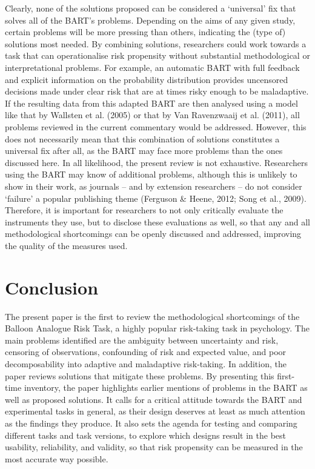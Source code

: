 \documentclass[serif, twocolumn, review]{jote-article}
\begin{document}
Clearly, none of the solutions proposed can be considered a `universal' fix that solves all of the BART's problems. Depending on the aims of any given study, certain problems will be more pressing than others, indicating the (type of) solutions most needed. By combining solutions, researchers could work towards a task that can operationalise risk propensity without substantial methodological or interpretational problems. For example, an automatic BART with full feedback and explicit information on the probability distribution provides uncensored decisions made under clear risk that are at times risky enough to be maladaptive. If the resulting data from this adapted BART are then analysed using a model like that by Wallsten et al. (2005) or that by Van Ravenzwaaij et al. (2011), all problems reviewed in the current commentary would be addressed. However, this does not necessarily mean that this combination of solutions constitutes a universal fix after all, as the BART may face more problems than the ones discussed here. In all likelihood, the present review is not exhaustive. Researchers using the BART may know of additional problems, although this is unlikely to show in their work, as journals -- and by extension researchers -- do not consider `failure' a popular publishing theme (Ferguson \& Heene, 2012; Song et al., 2009). Therefore, it is important for researchers to not only critically evaluate the instruments they use, but to disclose these evaluations as well, so that any and all methodological shortcomings can be openly discussed and addressed, improving the quality of the measures used.

{}
\section*{Conclusion}
\gotoreview
\label{sec:conclusion}

The present paper is the first to review the methodological shortcomings of the Balloon Analogue Risk Task, a highly popular risk-taking task in psychology. The main problems identified are the ambiguity between uncertainty and risk, censoring of observations, confounding of risk and expected value, and poor decomposability into adaptive and maladaptive risk-taking. In addition, the paper reviews solutions that mitigate these problems. By presenting this first-time inventory, the paper highlights earlier mentions of problems in the BART as well as proposed solutions. It calls for a critical attitude towards the BART and experimental tasks in general, as their design deserves at least as much attention as the findings they produce. It also sets the agenda for testing and comparing different tasks and task versions, to explore which designs result in the best usability, reliability, and validity, so that risk propensity can be measured in the most accurate way possible.
\end{document}
